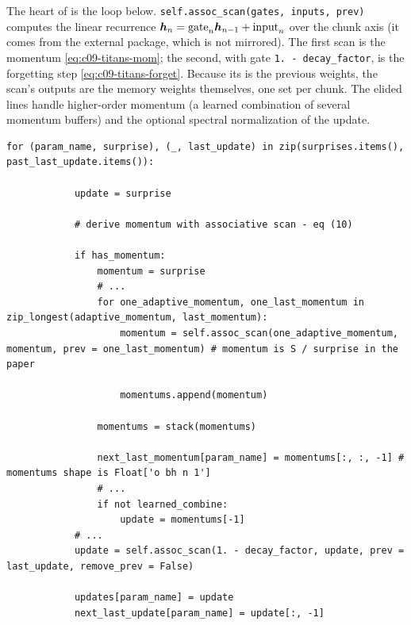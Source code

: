 The heart of  is the loop below. \texttt{self.assoc\_scan(gates, inputs, prev)}
computes the linear recurrence $\bm{h}_n = \text{gate}_n\bm{h}_{n-1} + \text{input}_n$ over the chunk
axis (it comes from the external  package, which is not mirrored). The first
scan is the momentum \eqref{eq:c09-titans-mom}; the second, with gate
\texttt{1. - decay\_factor}, is the forgetting step \eqref{eq:c09-titans-forget}. Because its
 is the previous weights, the scan's outputs are the memory weights themselves, one
set per chunk. The elided lines handle higher-order momentum (a learned combination of several
momentum buffers) and the optional spectral normalization of the update.

\begin{lstlisting}[caption={Excerpt from \texttt{repos/\allowbreak{}lucidrains\_\_titans-pytorch/\allowbreak{}titans\_pytorch/\allowbreak{}neural\_memory.py} (\texttt{NeuralMemory.store\_memories})},label={lst:c09-titans-store}]
        for (param_name, surprise), (_, last_update) in zip(surprises.items(), past_last_update.items()):

            update = surprise

            # derive momentum with associative scan - eq (10)

            if has_momentum:
                momentum = surprise
                # ...
                for one_adaptive_momentum, one_last_momentum in zip_longest(adaptive_momentum, last_momentum):
                    momentum = self.assoc_scan(one_adaptive_momentum, momentum, prev = one_last_momentum) # momentum is S / surprise in the paper

                    momentums.append(momentum)

                momentums = stack(momentums)

                next_last_momentum[param_name] = momentums[:, :, -1] # momentums shape is Float['o bh n 1']
                # ...
                if not learned_combine:
                    update = momentums[-1]
            # ...
            update = self.assoc_scan(1. - decay_factor, update, prev = last_update, remove_prev = False)

            updates[param_name] = update
            next_last_update[param_name] = update[:, -1]
\end{lstlisting}


